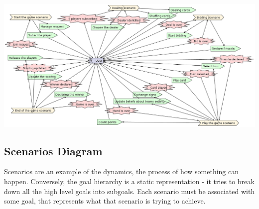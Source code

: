 \documentclass[a4paper]{article}
\begin{document}
\includegraphics[keepaspectratio,scale=0.3]{pdt/images/system_specification/analysis_overview.png}

\subsection{Scenarios Diagram}

Scenarios are an example of the dynamics, the process of how something can happen. Conversely, the goal hierarchy is a static representation  - it tries to break down all the high level goals into subgoals. Each scenario must be associated with some goal, that represents what that scenario is trying to achieve. 
\end{document}
